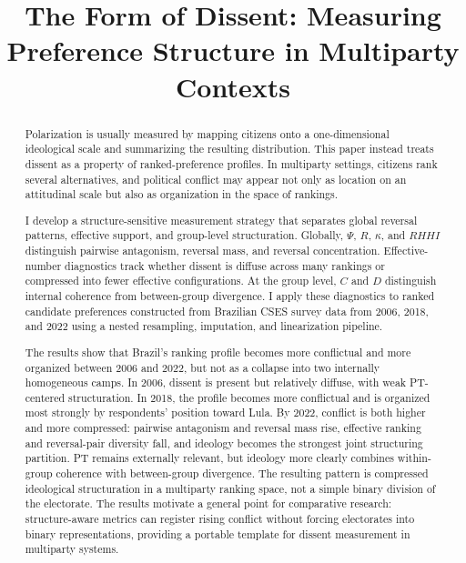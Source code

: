 \documentclass[12pt]{article}
\title{The Form of Dissent: Measuring Preference Structure in Multiparty Contexts}
\author{}
\date{} %
\begin{document}
\maketitle


\begin{abstract}
Polarization is usually measured by mapping citizens onto a one-dimensional ideological scale and summarizing the resulting distribution. This paper instead treats dissent as a property of ranked-preference profiles. In multiparty settings, citizens rank several alternatives, and political conflict may appear not only as location on an attitudinal scale but also as organization in the space of rankings.

I develop a structure-sensitive measurement strategy that separates global reversal patterns, effective support, and group-level structuration. Globally, \(\Psi\), \(R\), \(\kappa\), and \(RHHI\) distinguish pairwise antagonism, reversal mass, and reversal concentration. Effective-number diagnostics track whether dissent is diffuse across many rankings or compressed into fewer effective configurations. At the group level, \(C\) and \(D\) distinguish internal coherence from between-group divergence. I apply these diagnostics to ranked candidate preferences constructed from Brazilian CSES survey data from 2006, 2018, and 2022 using a nested resampling, imputation, and linearization pipeline.

The results show that Brazil's ranking profile becomes more conflictual and more
organized between 2006 and 2022, but not as a collapse into two internally
homogeneous camps. In 2006, dissent is present but relatively diffuse, with weak
PT-centered structuration. In 2018, the profile becomes more conflictual and is
organized most strongly by respondents' position toward Lula. By 2022, conflict
is both higher and more compressed: pairwise antagonism and reversal mass rise,
effective ranking and reversal-pair diversity fall, and ideology becomes the
strongest joint structuring partition. PT remains externally relevant, but
ideology more clearly combines within-group coherence with between-group divergence.
The resulting pattern is compressed ideological structuration in a multiparty
ranking space, not a simple binary division of the electorate. The results
motivate a general point for comparative research: structure-aware metrics can
register rising conflict without forcing electorates into binary
representations, providing a portable template for dissent measurement in
multiparty systems.
\end{abstract}
\end{document}
